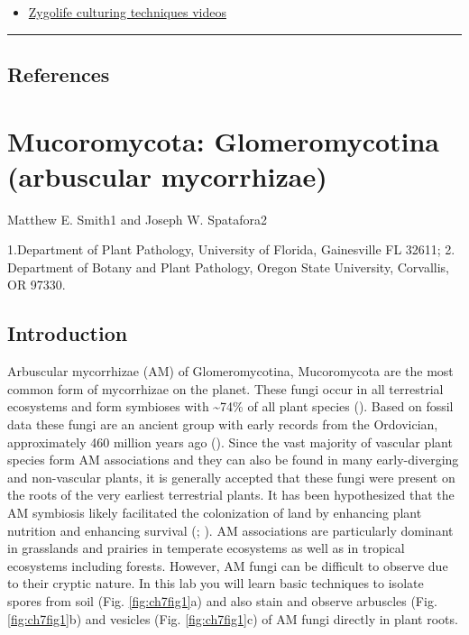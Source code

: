 \documentclass[]{book}
\providecommand{\tightlist}{%
  \setlength{\itemsep}{0pt}\setlength{\parskip}{0pt}}
\begin{document}
\begin{itemize}
\tightlist
\item
  \href{https://www.youtube.com/watch?v=tyVJNsp-WbA\&list=PLEFF-Vc5lo2bxLDw7-rWF4lE9opWwb7fi}{Zygolife culturing techniques videos}
\end{itemize}

\begin{center}\rule{0.5\linewidth}{\linethickness}\end{center}

\hypertarget{references-4}{%
\section{References}\label{references-4}}

\hypertarget{Glomeromycotina}{%
\chapter{Mucoromycota: Glomeromycotina (arbuscular mycorrhizae)}\label{Glomeromycotina}}

Matthew E. Smith1 and Joseph W. Spatafora2

1.Department of Plant Pathology, University of Florida, Gainesville FL 32611; 2. Department of Botany and Plant Pathology, Oregon State University, Corvallis, OR 97330.

\hypertarget{introduction-5}{%
\section{Introduction}\label{introduction-5}}

Arbuscular mycorrhizae (AM) of Glomeromycotina, Mucoromycota are the most common form of mycorrhizae on the planet. These fungi occur in all terrestrial ecosystems and form symbioses with \textasciitilde74\% of all plant species (\citet{Brundrett_2009}). Based on fossil data these fungi are an ancient group with early records from the Ordovician, approximately 460 million years ago (\citet{Redecker_2000}). Since the vast majority of vascular plant species form AM associations and they can also be found in many early-diverging and non-vascular plants, it is generally accepted that these fungi were present on the roots of the very earliest terrestrial plants. It has been hypothesized that the AM symbiosis likely facilitated the colonization of land by enhancing plant nutrition and enhancing survival (\citet{Brundrett_2009}; \citet{Bidartondo_2011}). AM associations are particularly dominant in grasslands and prairies in temperate ecosystems as well as in tropical ecosystems including forests. However, AM fungi can be difficult to observe due to their cryptic nature. In this lab you will learn basic techniques to isolate spores from soil (Fig. \ref{fig:ch7fig1}a) and also stain and observe arbuscles (Fig. \ref{fig:ch7fig1}b) and vesicles (Fig. \ref{fig:ch7fig1}c) of AM fungi directly in plant roots.
\end{document}

